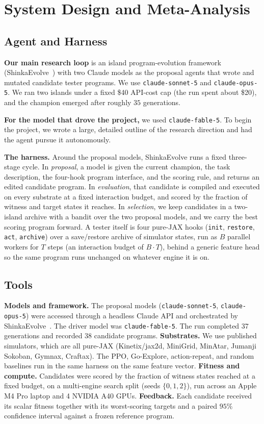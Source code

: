 \documentclass{article}
\begin{document}
\section{System Design and Meta-Analysis}

\subsection{Agent and Harness}
\label{sec:agent}
\textbf{Our main research loop} is an island program-evolution framework (ShinkaEvolve~\citep{shinkaevolve}) with two Claude models
as the proposal agents that wrote and mutated candidate tester programs. We use \texttt{claude-sonnet-5} and
\texttt{claude-opus-5}. We ran two islands under a fixed \$40 API-cost cap (the run spent about \$20), and the champion
emerged after roughly $35$ generations.

\textbf{For the model that drove the project,} we used \texttt{claude-fable-5}. To begin the project, we wrote a large,
detailed outline of the research direction and had the agent pursue it autonomously.

\textbf{The harness.} Around the proposal models, ShinkaEvolve runs a fixed three-stage cycle. In \emph{proposal}, a model
is given the current champion, the task description, the four-hook program interface, and the scoring rule, and returns an
edited candidate program. In \emph{evaluation}, that candidate is compiled and executed on every substrate at a fixed
interaction budget, and scored by the fraction of witness and target states it reaches. In \emph{selection}, we keep candidates in a two-island archive with a bandit over the two proposal models, and we carry the best scoring program forward. A
tester itself is four pure-JAX hooks (\texttt{init}, \texttt{restore}, \texttt{act}, \texttt{archive}) over a save/restore
archive of simulator states, run as $B$ parallel workers for $T$ steps (an interaction budget of $B\!\cdot\!T$), behind a
generic feature head so the same program runs unchanged on whatever engine it is on.

\subsection{Tools}
\label{sec:tools}
\textbf{Models and framework.} The proposal models (\texttt{claude-sonnet-5}, \texttt{claude-opus-5}) were accessed through
a headless Claude API and orchestrated by ShinkaEvolve~\citep{shinkaevolve}. The driver model was \texttt{claude-fable-5}. The run completed $37$ generations and recorded $38$ candidate
programs.
\textbf{Substrates.} We use published simulators, which are all pure-JAX (Kinetix/jax2d, MiniGrid, MinAtar, Jumanji
Sokoban, Gymnax, Craftax). The PPO, Go-Explore, action-repeat, and random baselines run in the same harness on the same
feature vector.
\textbf{Fitness and compute.} Candidates were scored by the fraction of witness states reached at a fixed budget, on a
multi-engine search split (seeds $\{0,1,2\}$), run across an Apple M4 Pro laptop and 4 NVIDIA A40 GPUs.
\textbf{Feedback.} Each candidate received its scalar fitness together with its worst-scoring targets and a paired
$95\%$ confidence interval against a frozen reference program. 
\end{document}

